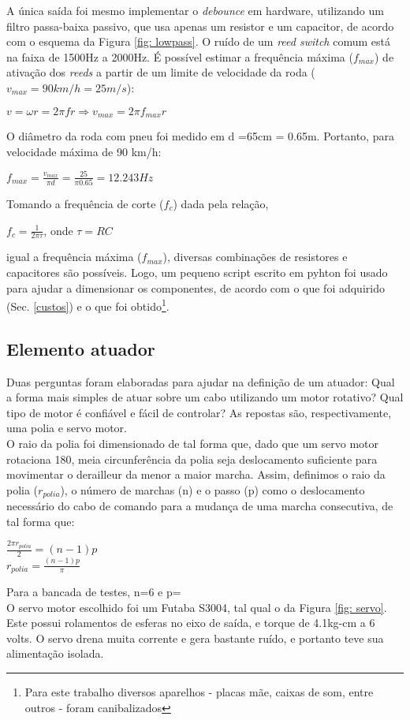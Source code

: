 \documentclass[a4paper,11pt]{article}
\begin{document}
A única saída foi mesmo implementar o \textit{debounce} em hardware, utilizando um filtro passa-baixa passivo, que usa apenas um resistor e um capacitor, de acordo com o esquema da Figura \ref{fig: lowpass}. O ruído de um \textit{reed switch} comum está na faixa de 1500Hz a 2000Hz\cite{reed}. É possível estimar a frequência máxima ($f_{max}$) de ativação dos \textit{reeds} a partir de um limite de velocidade da roda ($v_{max} = 90 km/h = 25 m/s$):
\begin{center}
$ v = \omega r = 2\pi f r \Rightarrow v_{max} = 2\pi f_{max} r $ 
\end{center}
O diâmetro da roda com pneu foi medido em d =65cm = 0.65m. Portanto, para velocidade máxima de 90 km/h:
\begin{center}
$ f_{max} = \frac{\displaystyle v_{max}}{\displaystyle \pi d} = \frac{\displaystyle 25}{\displaystyle \pi 0.65} = 12.243 Hz $ 
\end{center}
Tomando a frequência de corte ($f_{c}$) dada pela relação,
\begin{center}
 $ f_{c} = \frac{\displaystyle 1}{\displaystyle 2\pi\tau} $, onde $ \tau = RC $
\end{center}
igual a frequência máxima ($f_{max}$), diversas combinações de resistores e capacitores são possíveis. Logo, um pequeno script escrito em pyhton\cite{python} foi usado para ajudar a dimensionar os componentes, de acordo com o que foi adquirido (Sec. \ref{custos}) e o que foi obtido\footnote{Para este trabalho diversos aparelhos - placas mãe, caixas de som, entre outros -  foram canibalizados}.


%
\subsection{Elemento atuador}
\label{atuador}
Duas perguntas foram elaboradas para ajudar na definição de um atuador: Qual a forma mais simples de atuar sobre um cabo utilizando um motor rotativo? Qual tipo de motor é confiável e fácil de controlar? As repostas são, respectivamente, uma polia e servo motor. \\
O raio da polia foi dimensionado de tal forma que, dado que um servo motor rotaciona 180\textdegree, meia circunferência da polia seja deslocamento suficiente para movimentar o derailleur da menor a maior marcha. Assim, definimos o raio da polia ($r_{polia}$), o número de marchas (n) e o passo (p) como o deslocamento necessário do cabo de comando para a mudança de uma marcha consecutiva, de tal forma que:
\begin{center}
$ \frac{\displaystyle 2\pi r_{polia} }{\displaystyle 2} = (n-1)p $ \\
$ r_{polia} = \frac{\displaystyle (n-1)p}{\displaystyle \pi} $
\end{center}
Para a bancada de testes, n=6 e p=%
\\O servo motor escolhido foi um Futaba S3004, tal qual o da Figura \ref{fig: servo}. Este possui rolamentos de esferas no eixo de saída, e torque de 4.1kg-cm a 6 volts. O servo drena muita corrente e gera bastante ruído, e portanto teve sua alimentação isolada.
\end{document}
